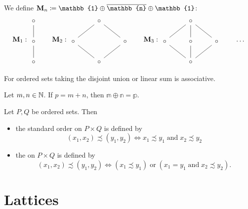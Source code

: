 \begin{example}
We define $\mathbf{M}_n \defeq \mathbb{1}\oplus \overline{\mathbb{n}} \oplus \mathbb{1}$:
\[ \mathbf{M}_1: \begin{tikzcd}
\circ \ar[d, dash] \\ \circ \ar[d, dash] \\ \circ
\end{tikzcd} \qquad \mathbf{M}_2: \begin{tikzcd}
&\circ \ar[ld, dash] \ar[rd, dash] & \\ \circ \ar[rd, dash] && \circ \ar[ld, dash] \\ &\circ &
\end{tikzcd} \qquad \mathbf{M}_3: \begin{tikzcd}
&\circ \ar[ld, dash] \ar[d,dash] \ar[rd, dash] &\\ \circ \ar[rd, dash]& \circ \ar[d, dash] & \circ \ar[ld, dash] \\ &\circ &
\end{tikzcd} \qquad \hdots \]
\end{example}

\begin{lemma}
For ordered sets taking the disjoint union or linear sum is associative.
\end{lemma}

\begin{lemma}
Let $m,n\in \mathbb{N}$. If $p = m+n$, then $\mathbb{m}\oplus\mathbb{n} = \mathbb{p}$.
\end{lemma}

\begin{definition}
Let $P,Q$ be ordered sets. Then
\begin{itemize}
\item  the standard order on $P\times Q$ is defined by
\[ (x_1,x_2) \precsim (y_1,y_2) \iff x_1\precsim y_1 \;\text{and}\; x_2\precsim y_2 \]
\item the  on $P\times Q$ is defined by
\[ (x_1,x_2) \precsim (y_1,y_2) \iff (x_1\precsim y_1) \;\text{or}\; (x_1=y_1 \;\text{and}\; x_2\precsim y_2). \]
\end{itemize}
\end{definition}


\chapter{Lattices}
